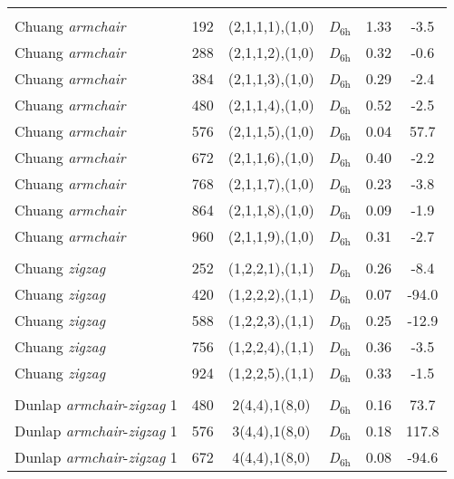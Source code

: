 \begin{table}[htbp!]
{\begin{tabular}{lccccc}
          &       &       &       &       &  \\
    Chuang \textit{armchair}& 192   & (2,1,1,1),(1,0) & \textit{D}$_{6\text{h}}$   & 1.33  & -3.5 \\
    Chuang \textit{armchair}& 288   & (2,1,1,2),(1,0) & \textit{D}$_{6\text{h}}$   & 0.32  & -0.6 \\
    Chuang \textit{armchair}& 384   & (2,1,1,3),(1,0) & \textit{D}$_{6\text{h}}$   & 0.29  & -2.4 \\
    Chuang \textit{armchair}& 480   & (2,1,1,4),(1,0) & \textit{D}$_{6\text{h}}$   & 0.52  & -2.5 \\
    Chuang \textit{armchair}& 576   & (2,1,1,5),(1,0) & \textit{D}$_{6\text{h}}$   & 0.04  & 57.7 \\
    Chuang \textit{armchair}& 672   & (2,1,1,6),(1,0) & \textit{D}$_{6\text{h}}$   & 0.40  & -2.2 \\
    Chuang \textit{armchair}& 768   & (2,1,1,7),(1,0) & \textit{D}$_{6\text{h}}$   & 0.23  & -3.8 \\
    Chuang \textit{armchair}& 864   & (2,1,1,8),(1,0) & \textit{D}$_{6\text{h}}$   & 0.09  & -1.9 \\
    Chuang \textit{armchair}& 960   & (2,1,1,9),(1,0) & \textit{D}$_{6\text{h}}$   & 0.31  & -2.7 \\
          &       &       &       &       &  \\
    Chuang \textit{zigzag} & 252   & (1,2,2,1),(1,1) & \textit{D}$_{6\text{h}}$   & 0.26  & -8.4 \\
    Chuang \textit{zigzag} & 420   & (1,2,2,2),(1,1) & \textit{D}$_{6\text{h}}$   & 0.07  & -94.0 \\
    Chuang \textit{zigzag} & 588   & (1,2,2,3),(1,1) & \textit{D}$_{6\text{h}}$   & 0.25  & -12.9 \\
    Chuang \textit{zigzag} & 756   & (1,2,2,4),(1,1) & \textit{D}$_{6\text{h}}$   & 0.36  & -3.5 \\
    Chuang \textit{zigzag} & 924   & (1,2,2,5),(1,1) & \textit{D}$_{6\text{h}}$   & 0.33  & -1.5 \\
          &       &       &       &       &  \\
    Dunlap \textit{armchair}-\textit{zigzag} 1& 480   & 2(4,4),1(8,0) & \textit{D}$_{6\text{h}}$   & 0.16  & 73.7 \\
    Dunlap \textit{armchair}-\textit{zigzag} 1& 576   & 3(4,4),1(8,0) & \textit{D}$_{6\text{h}}$   & 0.18  & 117.8 \\
    Dunlap \textit{armchair}-\textit{zigzag} 1& 672   & 4(4,4),1(8,0) & \textit{D}$_{6\text{h}}$   & 0.08  & -94.6 \\

\end{tabular}}
\end{table}
